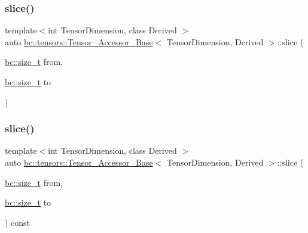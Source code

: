 \mbox{\label{classbc_1_1tensors_1_1Tensor__Accessor__Base_a6fa6239684251182ad8a3e2de90ec49e}} 
\subsubsection{\texorpdfstring{slice()}{slice()}\hspace{0.1cm}{\footnotesize\ttfamily [3/4]}}
{\footnotesize\ttfamily template$<$int Tensor\+Dimension, class Derived $>$ \\
auto \hyperlink{classbc_1_1tensors_1_1Tensor__Accessor__Base}{bc\+::tensors\+::\+Tensor\+\_\+\+Accessor\+\_\+\+Base}$<$ Tensor\+Dimension, Derived $>$\+::slice (\begin{DoxyParamCaption}\item[{\hyperlink{namespacebc_aaf8e3fbf99b04b1b57c4f80c6f55d3c5}{bc\+::size\+\_\+t}}]{from,  }\item[{\hyperlink{namespacebc_aaf8e3fbf99b04b1b57c4f80c6f55d3c5}{bc\+::size\+\_\+t}}]{to }\end{DoxyParamCaption})\hspace{0.3cm}{\ttfamily [inline]}}

\mbox{\label{classbc_1_1tensors_1_1Tensor__Accessor__Base_ae6922d7d801358130a580c28500d779a}} 
\subsubsection{\texorpdfstring{slice()}{slice()}\hspace{0.1cm}{\footnotesize\ttfamily [4/4]}}
{\footnotesize\ttfamily template$<$int Tensor\+Dimension, class Derived $>$ \\
auto \hyperlink{classbc_1_1tensors_1_1Tensor__Accessor__Base}{bc\+::tensors\+::\+Tensor\+\_\+\+Accessor\+\_\+\+Base}$<$ Tensor\+Dimension, Derived $>$\+::slice (\begin{DoxyParamCaption}\item[{\hyperlink{namespacebc_aaf8e3fbf99b04b1b57c4f80c6f55d3c5}{bc\+::size\+\_\+t}}]{from,  }\item[{\hyperlink{namespacebc_aaf8e3fbf99b04b1b57c4f80c6f55d3c5}{bc\+::size\+\_\+t}}]{to }\end{DoxyParamCaption}) const\hspace{0.3cm}{\ttfamily [inline]}}


